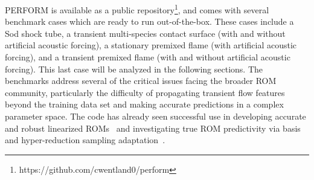 PERFORM is available as a public repository\footnote{https://github.com/cwentland0/perform}, and comes with several benchmark cases which are ready to run out-of-the-box. These cases include a Sod shock tube, a transient multi-species contact surface (with and without artificial acoustic forcing), a stationary premixed flame (with artificial acoustic forcing), and a transient premixed flame (with and without artificial acoustic forcing). This last case will be analyzed in the following sections. The benchmarks address several of the critical issues facing the broader ROM community, particularly the difficulty of propagating transient flow features beyond the training data set and making accurate predictions in a complex parameter space. The code has already seen successful use in developing accurate and robust linearized ROMs~\cite{Rezaian2022} and investigating true ROM predictivity via basis and hyper-reduction sampling adaptation~\cite{WayneIsaacTanUy2022}.
